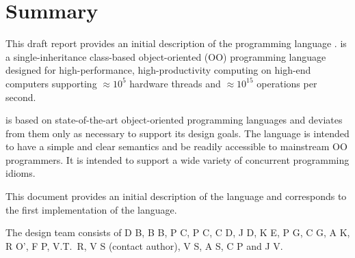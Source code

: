 
\thispagestyle{empty}




\chapter*{Summary}
This draft report provides an initial description of the programming
language \Xten. \Xten{} is a single-inheritance class-based object-oriented
(OO) programming language designed for high-performance, high-productivity
computing on high-end computers supporting $\approx 10^5$ hardware threads
and $\approx 10^{15}$ operations per second. 

{}\Xten{} is based on state-of-the-art object-oriented programming
languages and deviates from them only as necessary to support its
design goals. The language is intended to have a simple and clear
semantics and be readily accessible to mainstream OO programmers. It
is intended to support a wide variety of concurrent programming
idioms.

This document provides an initial description of the language and
corresponds to the first implementation of the language.  

The \Xten{} design team consists of
D B, 
B B, 
P C, 
P C, 
C D, 
J D, 
K E,
P G, 
C G, 
A K, 
R O', 
F P, 
V.T.~R, 
V S (contact author), 
V S,
A S,  
C P
and 
J V.

